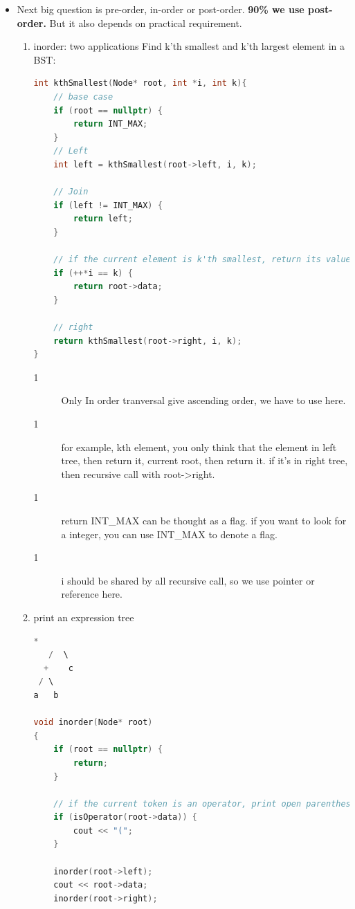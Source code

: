 \documentclass[a4paper,11pt,twoside]{book}
\begin{document}
\begin{itemize}
	

\item Next big question is pre-order, in-order or post-order. \textbf{90\% we use post-order.} But it also depends on practical requirement.


\begin{enumerate}
	\item inorder: two applications
	Find k’th smallest and k’th largest element in a BST:
\begin{lstlisting}[frame=single, language=c++]
int kthSmallest(Node* root, int *i, int k){
	// base case
	if (root == nullptr) {
		return INT_MAX;
	}
	// Left
	int left = kthSmallest(root->left, i, k);
	
	// Join
	if (left != INT_MAX) {
		return left;
	}
	
	// if the current element is k'th smallest, return its value
	if (++*i == k) {
		return root->data;
	}
	
	// right
	return kthSmallest(root->right, i, k);
}
\end{lstlisting}
\begin{description}
	\item[1] Only In order tranversal give ascending order, we have to use here.
	
	\item[1] for example, kth element, you only think that the element in left tree, then return it, current root, then return it.  if it's in right tree, then recursive call with root->right.
	
	\item[1] return INT\_MAX can be thought as a flag. if you want to look for a integer, you can use INT\_MAX to denote a flag.
	
	\item[1] i should be shared by all recursive call, so we use pointer or reference here. 
\end{description}

\item print an expression tree
\begin{lstlisting}[frame=single, language=c++]
     *
   /  \
  +    c
 / \
a   b
	
void inorder(Node* root)
{
	if (root == nullptr) {
		return;
	}
	
	// if the current token is an operator, print open parenthesis
	if (isOperator(root->data)) {
		cout << "(";
	}
	
	inorder(root->left);
	cout << root->data;
	inorder(root->right);
	

\end{lstlisting}
\end{enumerate}
\end{itemize}
\end{document}
